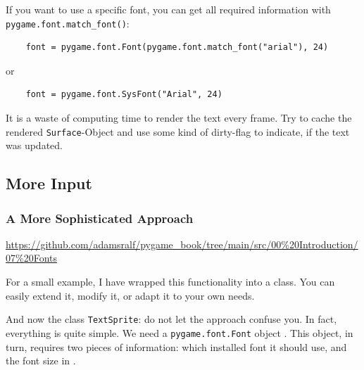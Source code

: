 If you want to use a specific font, you can get all required information with \texttt{pygame\-.font\-.match\_font()}:
\lstset{firstnumber=14}
\begin{lstlisting}
    font = pygame.font.Font(pygame.font.match_font("arial"), 24)
\end{lstlisting}

or 

\lstset{firstnumber=14}
\begin{lstlisting}
    font = pygame.font.SysFont("Arial", 24)
\end{lstlisting}

\begin{warningbox}
	It is a waste of computing time to render the text every frame. Try to cache the rendered \texttt{Surface}-Object and use some kind of dirty-flag to indicate, if the text was updated.
\end{warningbox}

\subsection{More Input}
\subsubsection{A More Sophisticated Approach}
\begin{diskbox}
	\url{https://github.com/adamsralf/pygame_book/tree/main/src/00%20Introduction/07%20Fonts}
\end{diskbox}

For a small example, I have wrapped this functionality into a class. You can easily extend it, modify it, or adapt it to your own needs.


And now the class \texttt{TextSprite}: do not let the  approach confuse you. In fact, everything is quite simple. We need a \texttt{pygame.font.\-Font} object . This object, in turn, requires two pieces of information: which installed \gls{font} it should use, and the font size in .

